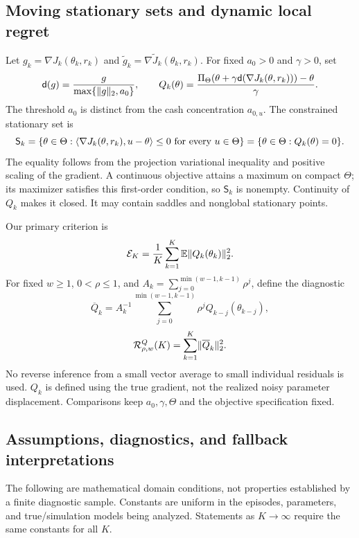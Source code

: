 \documentclass[11pt]{article}
\newcommand{\E}{\mathbb E}
\newcommand{\1}{\mathbf 1}
\DeclarePairedDelimiter{\norm}{\lVert}{\rVert}
\DeclarePairedDelimiter{\ip}{\langle}{\rangle}
\newcommand{\Reg}{\mathcal R}
\newcommand{\Sta}{\mathsf S}
\begin{document}
\subsection{Moving stationary sets and dynamic local regret}
Let $g_k=\nabla J_k(\theta_k,r_{k})$ and $\widetilde g_k=\nabla\widetilde J_k(\theta_k,r_{k})$. For fixed $a_0>0$ and $\gamma>0$, set
\begin{equation}\label{eq:normalized-map}
 \mathsf d(g)=\frac{g}{\max\{\norm{g}_2,a_0\}},\qquad
 Q_k(\theta)=\frac{\Pi_\Theta(\theta+\gamma \mathsf d(\nabla J_k(\theta,r_{k})))-\theta}{\gamma}.
\end{equation}
The threshold $a_0$ is distinct from the cash concentration $a_{0,u}$. The constrained stationary set is
\begin{equation}\label{eq:stationary-set}
 \Sta_k=\{\theta\in\Theta:\ip{\nabla J_k(\theta,r_{k}),u-\theta}\le0
 \text{ for every }u\in\Theta\}=\{\theta\in\Theta:Q_k(\theta)=0\}.
\end{equation}
The equality follows from the projection variational inequality and positive scaling of the gradient. A continuous objective attains a maximum on compact $\Theta$; its maximizer satisfies this first-order condition, so $\Sta_k$ is nonempty. Continuity of $Q_k$ makes it closed. It may contain saddles and nonglobal stationary points.

Our primary criterion is
\begin{equation}\label{eq:primary-residual}
 \mathcal E_K=\frac1K\sum_{k=1}^K\E\norm{Q_k(\theta_k)}_2^2.
\end{equation}
For fixed $w\ge1$, $0<\rho\le1$, and
$A_k=\sum_{j=0}^{\min(w-1,k-1)}\rho^j$, define the diagnostic
\begin{equation}\label{eq:smoothed-gradient}
 \overline Q_k=A_k^{-1}\sum_{j=0}^{\min(w-1,k-1)}\rho^j
 Q_{k-j}(\theta_{k-j}),
\end{equation}
\begin{equation}\label{eq:dynamic-regret}
 \Reg_{\rho,w}^{Q}(K)=\sum_{k=1}^K\norm{\overline Q_k}_2^2.
\end{equation}
No reverse inference from a small vector average to small individual residuals is used. $Q_k$ is defined using the true gradient, not the realized noisy parameter displacement. Comparisons keep $a_0,\gamma,\Theta$ and the objective specification fixed.

\subsection{Assumptions, diagnostics, and fallback interpretations}\label{subsec:assumptions}
The following are mathematical domain conditions, not properties established by a finite diagnostic sample. Constants are uniform in the episodes, parameters, and true/simulation models being analyzed. Statements as $K\to\infty$ require the same constants for all $K$.
\end{document}
